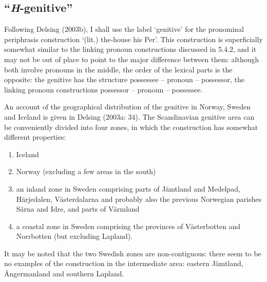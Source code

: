 \subsection[“H{}-genitive”]{“\textit{H}{}-genitive”}
\label{bkm:Ref154988643}%
Following Delsing (2003b), I shall use the label ‘genitive’ for the pronominal periphrasis construction  ‘(lit.) the-house his Per’. This construction is superficially somewhat similar to the linking pronoun constructions discussed in 5.4.2, and it may not be out of place to point to the major difference between them: although both involve pronouns in the middle, the order of the lexical parts is the opposite: the genitive has the structure possessee – pronoun – possessor, the linking pronoun constructions possessor – pronoun – possessee.

An account of the geographical distribution of the genitive in Norway, Sweden and Iceland is given in Delsing (2003a: 34). The Scandinavian genitive area can be conveniently divided into four zones, in which the construction has somewhat different properties:

\begin{enumerate} %
\item 
Iceland

\item 
Norway (excluding a few areas in the south) 

\item 
an inland zone in Sweden comprising parts of Jämtland and Medelpad, Härjedalen, Västerdalarna and probably also the previous Norwegian parishes Särna and Idre, and parts of Värmland

\item 
a coastal zone in Sweden comprising the provinces of Västerbotten and Norrbotten (but excluding Lapland).

\end{enumerate} %
It may be noted that the two Swedish zones are non-contiguous: there seem to be no examples of the construction in the intermediate area: eastern Jämtland, Ångermanland and southern Lapland. 

